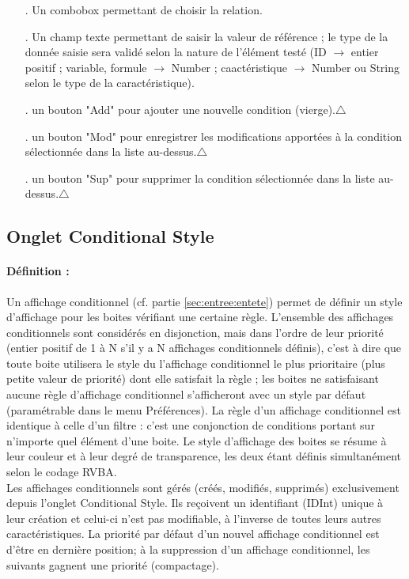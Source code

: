 \documentclass[a4paper]{article}
\begin{document}
\begin{itemize}
\begin{itemize}
  \item[.] Un combobox permettant de choisir la relation.
  \item[.] Un champ texte permettant de saisir la valeur de référence ; le type de la donnée saisie sera validé selon la nature de l'élément testé (ID $\to$ entier positif ; variable, formule $\to$ Number ; caactéristique $\to$ Number ou String selon le type de la caractéristique).
  \item[.] un bouton "Add" pour ajouter une nouvelle condition (vierge).$\triangle$
  \item[.] un bouton "Mod" pour enregistrer les modifications apportées à la condition sélectionnée dans la liste au-dessus.$\triangle$
  \item[.] un bouton "Sup" pour supprimer la condition sélectionnée dans la liste au-dessus.$\triangle$
  \end{itemize}
\end{itemize}


\subsection{Onglet Conditional Style}\label{sec:onglet:aff}

\paragraph{Définition :} Un affichage conditionnel (cf. partie \ref{sec:entree:entete}) permet de définir un style d'affichage pour les boites vérifiant une certaine règle. L'ensemble des affichages conditionnels sont considérés en disjonction, mais dans l'ordre de leur priorité (entier positif de 1 à N s'il y a N affichages conditionnels définis), c'est à dire que toute boite utilisera le style du l'affichage conditionnel le plus prioritaire (plus petite valeur de priorité) dont elle satisfait la règle ; les boites ne satisfaisant aucune règle d'affichage conditionnel s'afficheront avec un style par défaut (paramétrable dans le menu Préférences). La règle d'un affichage conditionnel est identique à celle d'un filtre : c'est une conjonction de conditions portant sur n'importe quel élément d'une boite. Le style d'affichage des boites se résume à leur couleur et à leur degré de transparence, les deux étant définis simultanément selon le codage RVBA.\\Les affichages conditionnels sont gérés (créés, modifiés, supprimés) exclusivement depuis l'onglet Conditional Style. Ils reçoivent un identifiant (IDInt) unique à leur création et celui-ci n'est pas modifiable, à l'inverse de toutes leurs autres caractéristiques. La priorité par défaut d'un nouvel affichage conditionnel est d'être en dernière position; à la suppression d'un affichage conditionnel, les suivants gagnent une priorité (compactage).
\end{document}
